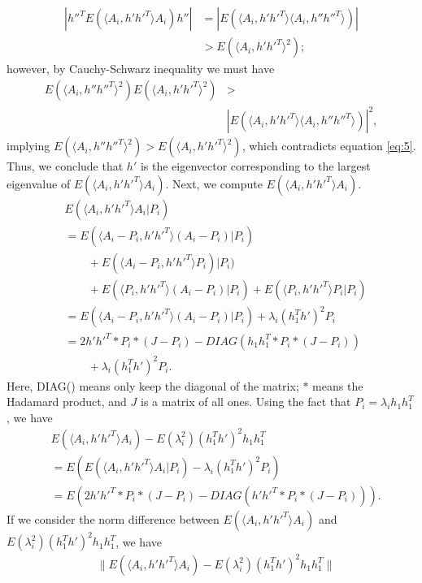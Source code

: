\documentclass[10pt,journal,compsoc]{IEEEtran}
\newenvironment{proof}[1][Proof]{\begin{trivlist}
		\item[\hskip \labelsep {\bfseries #1}]}{\end{trivlist}}
\begin{document}
\begin{proof} [Proof of Theorem 4.2]
	\begin{align*}  | h''^T E(\langle A_{i},h' h'^T \rangle A_{i}) h''| &= |E(\langle A_{i},h' h'^T \rangle \langle A_{i},h'' h''^T \rangle)| \\
	&> E(\langle A_{i},h' h'^T \rangle ^2);
	\end{align*}
	however, by Cauchy-Schwarz inequality we must have
	\begin{align*} E(\langle A_{i},h'' h''^T \rangle^2)  E(\langle A_{i},h' h'^T \rangle^2) &> \\
	&|E(\langle A_{i},h' h'^T \rangle \langle A_{i},h'' h''^T \rangle)|^2,
	\end{align*}
	implying $E(\langle A_{i},h'' h''^T \rangle^2) > E(\langle A_{i},h' h'^T \rangle^2)$, which contradicts equation \eqref{eq:5}. Thus, we conclude that $h'$ is the eigenvector corresponding to the largest eigenvalue of $E(\langle A_{i},h' h'^T \rangle A_{i})$. Next, we compute $E(\langle A_{i},h' h'^T \rangle A_{i})$.
	\begin{align*}
	&E(\langle A_{i},h' h'^T \rangle A_{i}|P_i)    \\
	&=E( \langle A_{i}-P_i,h' h'^T \rangle (A_{i}-P_i)|P_i)\\
	&\qquad {}+E(\langle A_{i}-P_i,h' h'^T \rangle P_i)|P_i) \\
	&\qquad {} +E(\langle P_i,h' h'^T \rangle (A_{i}-P_i)|P_i)+E(\langle P_i,h' h'^T \rangle P_i|P_i) \\
	&= E(\langle A_{i}-P_i,h' h'^T \rangle (A_{i}-P_i)|P_i) + \lambda_i (h_1^Th')^2 P_i \\
	&=  2h' h'^T *P_i*(J-P_i) - DIAG(h_1 h_1^T *P_i*(J-P_i)) 	\\
	&\qquad {}+\lambda_i (h_1^Th')^2 P_i .
	\end{align*}
	Here, DIAG() means only keep the diagonal of the matrix; $*$ means the Hadamard product, and $J$ is a matrix of all ones. Using the fact that $P_i=\lambda_i h_1 h_1 ^T$, we have 
	\begin{align*}
	&E(\langle A_{i},h' h'^T \rangle A_{i}) - E(\lambda_i^2) (h_1^Th')^2 h_1 h_1^T \\
	&=E(E(\langle A_{i},h' h'^T \rangle A_{i}|P_i)-\lambda_i (h_1^Th')^2 P_i) 
	 \\
	&= E(2 h' h'^T *P_i*(J-P_i) - DIAG(h' h'^T*P_i*(J-P_i))).
	\end{align*}
	If we consider the norm difference between $E( \langle A_{i},h' h'^T \rangle A_{i})$ and $ E(\lambda_i^2) (h_1^Th')^2 h_1 h_1^T$, we have
	\begin{align*}
	&\|E(\langle A_{i},h' h'^T \rangle A_{i} ) - E(\lambda_i^2) (h_1^Th')^2 h_1 h_1^T\| \\

\end{align*}
\end{proof}
\end{document}
